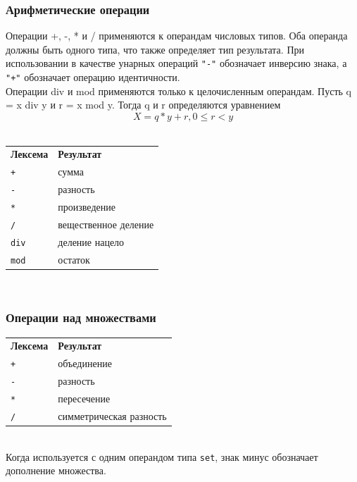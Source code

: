 \documentclass[a4paper,12pt]{article}
\newcommand{\lit}[1]{\texttt{"#1"}}
\begin{document}
    \subsubsection*{Арифметические операции}

    Операции +, -, * и / применяются к операндам числовых типов. Оба операнда должны быть одного типа, что также определяет тип результата. При использовании в качестве унарных операций \lit{-} обозначает инверсию знака, а \lit{+} обозначает операцию идентичности.\\

    Операции div и mod применяются только к целочисленным операндам. Пусть q = x div y и r = x mod y. Тогда q и r определяются уравнением $$X = q*y + r, 0 \leq r < y$$\\

    \begin{tabular}{ll}
        \textbf{Лексема} & \textbf{Результат} \\
        \texttt{+} & сумма \\
        \texttt{-} & разность \\
        \texttt{*} & произведение \\
        \texttt{/} & вещественное деление \\
        \texttt{div} & деление нацело \\
        \texttt{mod} & остаток \\
    \end{tabular}\\


    \subsubsection*{Операции над множествами}

    \begin{tabular}{ll}
        \textbf{Лексема} & \textbf{Результат} \\
        \texttt{+} & объединение \\
        \texttt{-} & разность \\
        \texttt{*} & пересечение \\
        \texttt{/} & симметрическая разность \\
    \end{tabular}\\

    Когда используется с одним операндом типа \texttt{set}, знак минус обозначает дополнение множества.
\end{document}
